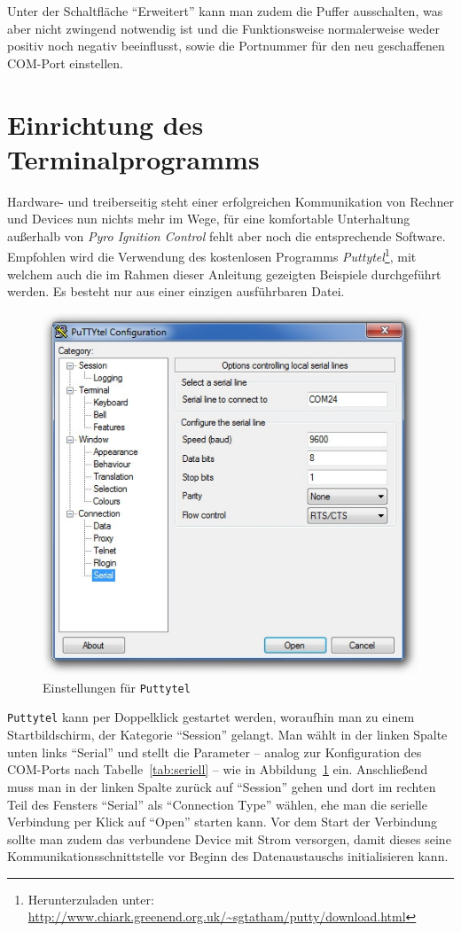 \documentclass[pdftex, parskip, numbers=noenddot, toc=listof]{scrbook}
\newcommand{\pic}{\emph{Pyro Ignition Control}}
\begin{document}
	Unter der Schaltfläche \enquote{Erweitert} kann man zudem die Puffer ausschalten, was aber nicht zwingend notwendig ist und die Funktionsweise normalerweise weder positiv noch negativ beeinflusst, sowie die Portnummer für den neu geschaffenen COM-Port einstellen.


	\section{Einrichtung des Terminalprogramms}

	Hardware- und treiberseitig steht einer erfolgreichen Kommunikation von Rechner und Devices nun nichts mehr im Wege, für eine komfortable Unterhaltung außerhalb von {\pic} fehlt aber noch die entsprechende Software. Empfohlen wird die Verwendung des kostenlosen Programms \emph{Puttytel}\footnote{Herunterzuladen unter: \url{http://www.chiark.greenend.org.uk/~sgtatham/putty/download.html}}, mit welchem auch die im Rahmen dieser Anleitung gezeigten Beispiele durchgeführt werden. Es besteht nur aus einer einzigen ausführbaren Datei.

	\begin{figure}
		\centering
		\includegraphics[width=.75\textwidth]{Bilder/puttytelstart}
		\caption{Einstellungen für \texttt{Puttytel}}
		\label{fig:puttytelstart}
	\end{figure}

	\texttt{Puttytel} kann per Doppelklick gestartet werden, woraufhin man zu einem Startbildschirm, der Kategorie \enquote{Session} gelangt. Man wählt in der linken Spalte unten links \enquote{Serial} und stellt die Parameter -- analog zur Konfiguration des COM-Ports nach Tabelle~\ref{tab:seriell} -- wie in Abbildung~\ref{fig:puttytelstart} ein. Anschließend muss man in der linken Spalte zurück auf \enquote{Session} gehen und dort im rechten Teil des Fensters \enquote{Serial} als \enquote{Connection Type} wählen, ehe man die serielle Verbindung per Klick auf \enquote{Open} starten kann. Vor dem Start der Verbindung sollte man zudem das verbundene Device mit Strom versorgen, damit dieses seine Kommunikationsschnittstelle vor Beginn des Datenaustauschs initialisieren kann.
\end{document}
